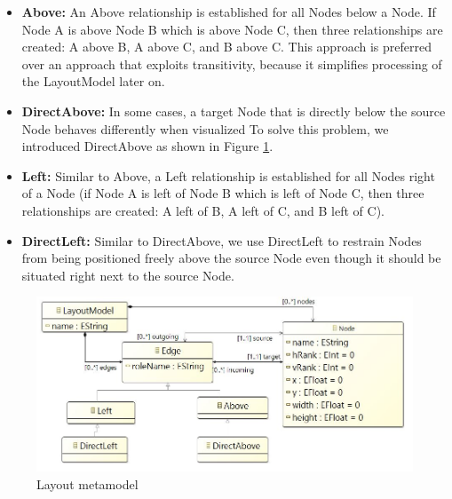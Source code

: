 \begin{itemize}
\item \textbf{Above:} An Above relationship is established for all Nodes below a Node. If Node A is above Node B which is above Node C, then three relationships are created: A above B, A above C, and B above C. This approach is preferred over an approach that exploits transitivity, because it simplifies processing of the LayoutModel later on.
\item \textbf{DirectAbove:} In some cases, a target Node that is directly below the source Node behaves differently when visualized  To solve this problem, we introduced DirectAbove as shown in Figure \ref{fig : metamodel diagram}. 
\item \textbf{Left:} Similar to Above, a Left relationship is established for all Nodes right of a Node (if Node A is left of Node B which is left of Node C, then three relationships are created: A left of B, A left of C, and B left of C). 
\item \textbf{DirectLeft:} Similar to DirectAbove, we use DirectLeft to restrain Nodes from being positioned freely above the source Node even though it should be situated right next to the source Node.
\end{itemize}

\begin{figure}
	\includegraphics[width=1\linewidth]{metamodel}
	\caption{Layout metamodel}
	\label{fig : metamodel diagram}
\end{figure}

